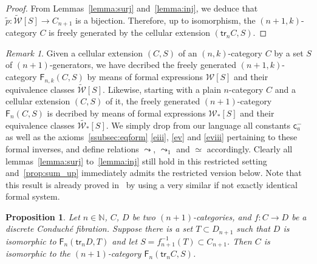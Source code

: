 \documentclass[reqno]{amsart}
\theoremstyle{plain}
\newtheorem{proposition}[subsubsection]{Proposition}
\theoremstyle{definition}
\theoremstyle{remark}
\newtheorem{remark}[subsubsection]{Remark}
\newcommand{\nmbr}[1]{\mathbb #1}
\newcommand{\N}{\nmbr{N}}
\newcommand{\pair}[2]{(#1,#2)}       %
\newcommand{\functor}[1]{\mathsf{#1}} %
\newcommand{\trk}[1]{\functor{tr}_{#1}}%
\newcommand{\frf}[1]{\functor{F}_{#1}} %
\newcommand{\clx}[2]{\pair{#1}{#2}}%
\newcommand{\WW}{\mathcal{W}}
\newcommand{\clWW}{\fcls{\WW}}
\newcommand{\wtx}[1]{\WW[#1]} %
\newcommand{\wtxeq}[1]{\clWW[#1]} %
\newcommand{\formal}[1]{\mathsf{#1}} %
\newcommand{\finv}[1]{\formal{c}^{\boldsymbol{-}}_{#1}}%
\newcommand{\frel}{\leadsto} %
\newcommand{\cfrel}{\leadsto_1} %
\newcommand{\freq}{\simeq} %
\newcommand{\fcls}[1]{\widetilde{#1}}%
\newcommand{\WWo}{\mathcal{W}_*}
\newcommand{\clWWo}{\fcls{\WWo}}
\newcommand{\wtxo}[1]{\WWo[#1]} %
\newcommand{\wtxeqo}[1]{\clWWo[#1]} %
\begin{document}
\begin{proof}
  From Lemmas~\ref{lemma:surj} and~\ref{lemma:inj}, we deduce that
  $\fcls p:\wtxeq S\to C_{n+1}$ is a bijection. Therefore, up to
  isomorphism, the $\pair{n+1}k$-category $C$ is freely generated by the cellular
  extension $\clx{\trk nC}S$.
\end{proof}
\begin{remark}\label{remark:ncat}
 Given a cellular extension $\clx CS$ of an $\pair nk$-category $C$ by
 a set $S$ of $(n{+}1)$-generators, we have decribed the freely
 generated $\pair{n{+}1}{k}$-category $\frf{n,k}\clx CS$ by means of
 formal expressions $\wtx S$ and their equivalence classes $\wtxeq
 S$. Likewise, starting with a plain $n$-category $C$ and a cellular
 extension $\clx CS$ of it, the freely generated $(n{+}1)$-category
 $\frf n\clx CS$  is decribed by means of formal expressions $\wtxo S$
 and their equivalence classes $\wtxeqo S$. We simply drop from our
 language all  constants $\finv a$ as well as the
 axioms~\ref{ssubsec:eqform} \ref{eiii}, \ref{ev} and \ref{eviii} 
 pertaining to these formal inverses, and define relations $\frel$,
 $\cfrel$ and $\freq$ accordingly. Clearly all lemmas~\ref{lemma:surj}
 to~\ref{lemma:inj} still hold in this restricted setting
 and~\cref{prop:sum_up} immediately admits the restricted
 version below. Note that this result is already proved
 in~\cite{guetta:poldcf} by using a very similar if not exactly
 identical formal system.
\end{remark}
\begin{proposition}\label{prop:sum_up_restr}
  Let $n\in\N$, $C$, $D$ be two $(n{+}1)$-categories, and $f:C\to D$ be a
  discrete Conduché fibration. Suppose there is a set $T\subset D_{n+1}$ such
  that $D$ is isomorphic to $\frf n\clx{\trk nD}{T}$ and  let
  $S=f_{n+1}^{-1}(T)\subset C_{n+1}$. Then $C$ is isomorphic to the
  $(n{+}1)$-category $\frf n\clx{\trk nC}{S}$.
\end{proposition}
\end{document}
